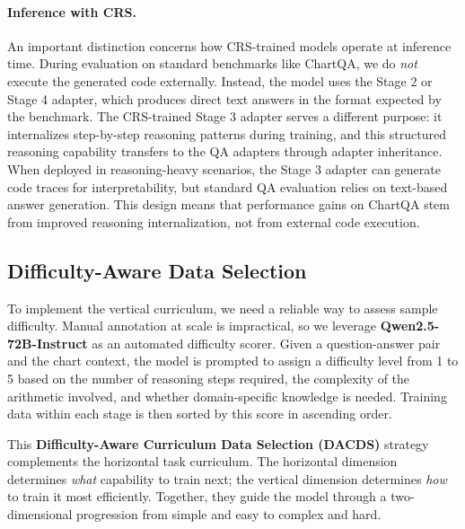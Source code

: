 \documentclass[journal]{IEEEtran}
\newcommand{\crs}{CRS}
\newcommand{\dacds}{DACDS}
\begin{document}
\paragraph{Inference with \crs{}.}
An important distinction concerns how \crs{}-trained models operate at inference time. During evaluation on standard benchmarks like ChartQA, we do \emph{not} execute the generated code externally. Instead, the model uses the Stage 2 or Stage 4 adapter, which produces direct text answers in the format expected by the benchmark. The \crs{}-trained Stage 3 adapter serves a different purpose: it internalizes step-by-step reasoning patterns during training, and this structured reasoning capability transfers to the QA adapters through adapter inheritance. When deployed in reasoning-heavy scenarios, the Stage 3 adapter can generate code traces for interpretability, but standard QA evaluation relies on text-based answer generation. This design means that performance gains on ChartQA stem from improved reasoning internalization, not from external code execution.

\subsection{Difficulty-Aware Data Selection}
\label{sec:dacds}
To implement the vertical curriculum, we need a reliable way to assess sample difficulty. Manual annotation at scale is impractical, so we leverage \textbf{Qwen2.5-72B-Instruct} as an automated difficulty scorer. Given a question-answer pair and the chart context, the model is prompted to assign a difficulty level from 1 to 5 based on the number of reasoning steps required, the complexity of the arithmetic involved, and whether domain-specific knowledge is needed. Training data within each stage is then sorted by this score in ascending order.

This \textbf{Difficulty-Aware Curriculum Data Selection (\dacds{})} strategy complements the horizontal task curriculum. The horizontal dimension determines \textit{what} capability to train next; the vertical dimension determines \textit{how} to train it most efficiently. Together, they guide the model through a two-dimensional progression from simple and easy to complex and hard.
\end{document}
